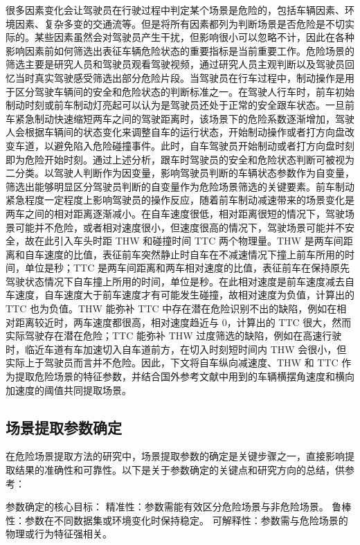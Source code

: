 很多因素变化会让驾驶员在行驶过程中判定某个场景是危险的，包括车辆因素、环境因素、复杂多变的交通流等。但是将所有因素都列为判断场景是否危险是不切实际的。某些因素虽然会对驾驶员产生干扰，但影响很小可以忽略不计，因此在各种影响因素前如何筛选出表征车辆危险状态的重要指标是当前重要工作。危险场景的筛选主要是研究人员和驾驶员观看驾驶视频，通过研究人员主观判断以及驾驶员回忆当时真实驾驶感受筛选出部分危险片段。当驾驶员在行车过程中，制动操作是用于区分驾驶车辆间的安全和危险状态的判断标准之一。在驾驶人行车时，前车初始制动时刻或前车制动灯亮起可以认为是驾驶员还处于正常的安全跟车状态。一旦前车紧急制动快速缩短两车之间的驾驶距离时，该场景下的危险系数逐渐增加，驾驶人会根据车辆间的状态变化来调整自车的运行状态，开始制动操作或者打方向盘改变车道，以避免陷入危险碰撞事件。此时，自车驾驶员开始制动或者打方向盘时刻即为危险开始时刻。通过上述分析，跟车时驾驶员的安全和危险状态判断可被视为二分类。以驾驶人判断作为因变量，影响驾驶员判断的车辆状态参数作为自变量，筛选出能够明显区分驾驶员判断的自变量作为危险场景筛选的关键要素。前车制动紧急程度一定程度上影响驾驶员的操作反应，随着前车制动减速带来的场景变化是两车之间的相对距离逐渐减小。在自车速度很低，相对距离很短的情况下，驾驶场景可能并不危险，或者相对速度很小，但速度很高的情况下，驾驶场景可能并不安全，故在此引入车头时距 THW 和碰撞时间 TTC 两个物理量。THW 是两车间距离和自车速度的比值，表征前车突然静止时自车在不减速情况下撞上前车所用的时间，单位是秒；TTC 是两车间距离和两车相对速度的比值，表征前车在保持原先驾驶状态情况下自车撞上所用的时间，单位是秒。在此相对速度是前车速度减去自车速度，自车速度大于前车速度才有可能发生碰撞，故相对速度为负值，计算出的 TTC 也为负值。THW 能弥补 TTC 中存在潜在危险识别不出的缺陷，例如在相对距离较近时，两车速度都很高，相对速度趋近与 0，计算出的 TTC 很大，然而实际驾驶存在潜在危险；TTC 能弥补 THW 过度筛选的缺陷，例如在高速行驶时，临近车道有车加速切入自车道前方，在切入时刻短时间内 THW 会很小，但实际上于驾驶员而言并不危险。因此，下文将自车纵向减速度、THW 和 TTC 作为提取危险场景的特征参数，并结合国外参考文献中用到的车辆横摆角速度和横向加速度的阈值共同提取场景。

\subsection{场景提取参数确定}

在危险场景提取方法的研究中，场景提取参数的确定是关键步骤之一，直接影响提取结果的准确性和可靠性。以下是关于参数确定的关键点和研究方向的总结，供参考：

参数确定的核心目标：
精准性：参数需能有效区分危险场景与非危险场景。
鲁棒性：参数在不同数据集或环境变化时保持稳定。
可解释性：参数需与危险场景的物理或行为特征强相关。

